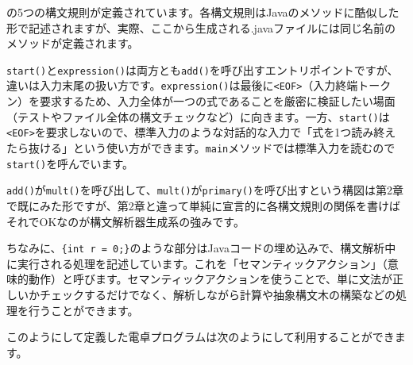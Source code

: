 の5つの構文規則が定義されています。各構文規則はJavaのメソッドに酷似した形で記述されますが、実際、ここから生成される.javaファイルには同じ名前のメソッドが定義されます。

\texttt{start()}と\texttt{expression()}は両方とも\texttt{add()}を呼び出すエントリポイントですが、違いは入力末尾の扱い方です。\texttt{expression()}は最後に\texttt{\textless{}EOF\textgreater{}}（入力終端トークン）を要求するため、入力全体が一つの式であることを厳密に検証したい場面（テストやファイル全体の構文チェックなど）に向きます。一方、\texttt{start()}は\texttt{\textless{}EOF\textgreater{}}を要求しないので、標準入力のような対話的な入力で「式を1つ読み終えたら抜ける」という使い方ができます。\texttt{main}メソッドでは標準入力を読むので\texttt{start()}を呼んでいます。

\texttt{add()}が\texttt{mult()}を呼び出して、\texttt{mult()}が\texttt{primary()}を呼び出すという構図は第2章で既にみた形ですが、第2章と違って単純に宣言的に各構文規則の関係を書けばそれでOKなのが構文解析器生成系の強みです。

ちなみに、\texttt{\{int\ r\ =\ 0;\}}のような部分はJavaコードの埋め込みで、構文解析中に実行される処理を記述しています。これを「セマンティックアクション」（意味的動作）と呼びます。セマンティックアクションを使うことで、単に文法が正しいかチェックするだけでなく、解析しながら計算や抽象構文木の構築などの処理を行うことができます。

このようにして定義した電卓プログラムは次のようにして利用することができます。

